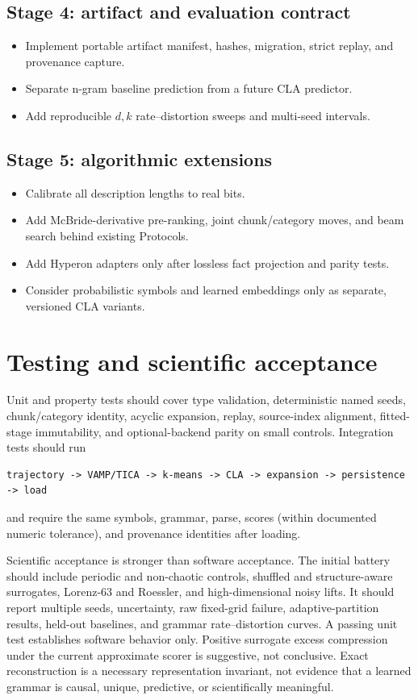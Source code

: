 \documentclass[11pt]{article}
\begin{document}
\subsection*{Stage 4: artifact and evaluation contract}
\begin{itemize}[nosep]
\item Implement portable artifact manifest, hashes, migration, strict replay,
  and provenance capture.
\item Separate n-gram baseline prediction from a future CLA predictor.
\item Add reproducible $d,k$ rate--distortion sweeps and multi-seed intervals.
\end{itemize}

\subsection*{Stage 5: algorithmic extensions}
\begin{itemize}[nosep]
\item Calibrate all description lengths to real bits.
\item Add McBride-derivative pre-ranking, joint chunk/category moves, and beam
  search behind existing Protocols.
\item Add Hyperon adapters only after lossless fact projection and parity tests.
\item Consider probabilistic symbols and learned embeddings only as separate,
  versioned CLA variants.
\end{itemize}

\section{Testing and scientific acceptance}

Unit and property tests should cover type validation, deterministic named seeds,
chunk/category identity, acyclic expansion, replay, source-index alignment,
fitted-stage immutability, and optional-backend parity on small controls.
Integration tests should run
\begin{verbatim}
trajectory -> VAMP/TICA -> k-means -> CLA -> expansion -> persistence -> load
\end{verbatim}
and require the same symbols, grammar, parse, scores (within documented numeric
tolerance), and provenance identities after loading.

Scientific acceptance is stronger than software acceptance. The initial battery
should include periodic and non-chaotic controls, shuffled and structure-aware
surrogates, Lorenz-63 and Roessler, and high-dimensional noisy lifts. It should
report multiple seeds, uncertainty, raw fixed-grid failure, adaptive-partition
results, held-out baselines, and grammar rate--distortion curves. A passing unit
test establishes software behavior only. Positive surrogate excess compression
under the current approximate scorer is suggestive, not conclusive. Exact
reconstruction is a necessary representation invariant, not evidence that a
learned grammar is causal, unique, predictive, or scientifically meaningful.
\end{document}
